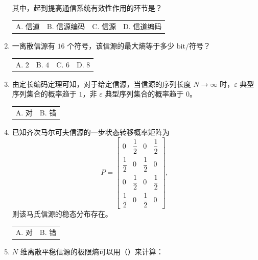 \documentclass[UTF8,a4paper,12pt]{ctexart}
\begin{document}
\begin{enumerate}[label=\arabic*., leftmargin=2em, itemsep=1.4em]
\begin{center}
\end{center}

其中，起到提高通信系统有效性作用的环节是？

\begin{tabular}{@{}p{}p{}p{}p{}@{}}
A. 信道 & B. 信源编码 & C. 信源 & D. 信道编码
\end{tabular}

\item 一离散信源有 $16$ 个符号，该信源的最大熵等于多少
$\mathrm{bit/}$符号？

\begin{tabular}{@{}p{}p{}p{}p{}@{}}
A. $2$ & B. $4$ & C. $6$ & D. $8$
\end{tabular}


\item 由定长编码定理可知，对于给定信源，当信源的序列长度 $N\to\infty$ 时，$\varepsilon$ 典型序列集合的概率趋于 $1$，非 $\varepsilon$ 典型序列集合的概率趋于 $0$。

\begin{tabular}{@{}p{}p{}@{}}
A. 对 & B. 错
\end{tabular}


\item 已知齐次马尔可夫信源的一步状态转移概率矩阵为
\[
P=
\begin{bmatrix}
0 & \dfrac{1}{2} & 0 & \dfrac{1}{2} \\[0.4em]
\dfrac{1}{2} & 0 & \dfrac{1}{2} & 0 \\[0.4em]
0 & \dfrac{1}{2} & 0 & \dfrac{1}{2} \\[0.4em]
\dfrac{1}{2} & 0 & \dfrac{1}{2} & 0
\end{bmatrix},
\]
则该马氏信源的稳态分布存在。

\begin{tabular}{@{}p{}p{}@{}}
A. 对 & B. 错
\end{tabular}

\item $N$ 维离散平稳信源的极限熵可以用（\hspace{1.2cm}）来计算：


\end{enumerate}
\end{document}
